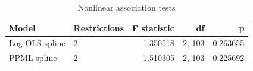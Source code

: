 \begin{table}[htbp]\centering\small
\caption{Nonlinear association tests}\label{tab:nonlinear_tests}
\begin{tabular}{@{}llrrr@{}}
\toprule
Model & Restrictions & F statistic & df & p \\\midrule
Log-OLS spline & 2 & 1.350518 & 2, 103 & 0.263655 \\
PPML spline & 2 & 1.510305 & 2, 103 & 0.225692 \\
\bottomrule\end{tabular}
\end{table}
